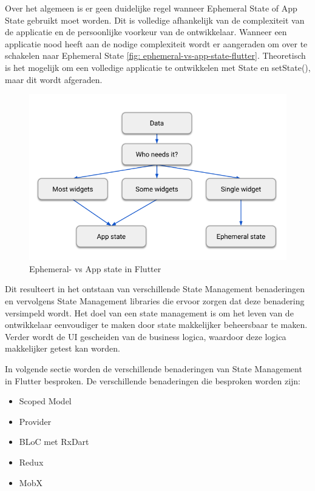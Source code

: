 Over het algemeen is er geen duidelijke regel wanneer Ephemeral State of App State gebruikt moet worden. Dit is volledige afhankelijk van de complexiteit van de applicatie en de persoonlijke voorkeur van de ontwikkelaar.
Wanneer een applicatie nood heeft aan de nodige complexiteit wordt er aangeraden om over te schakelen naar Ephemeral State \ref{fig: ephemeral-vs-app-state-flutter}. Theoretisch is het mogelijk om een volledige applicatie te ontwikkelen met State en setState(), maar dit wordt afgeraden.
\begin{figure}[H]
    \includegraphics[width=\linewidth]{img/stand-van-zaken/ephemeral-vs-app-state-flutter.png}
    \caption{Ephemeral- vs App state in Flutter}
    \label{fig:ephemeral-vs-app-state-flutter}
\end{figure}

Dit resulteert in het ontstaan van verschillende State Management benaderingen en vervolgens State Management libraries die ervoor zorgen dat deze benadering versimpeld wordt.
Het doel van een state management is om het leven van de ontwikkelaar eenvoudiger te
maken door state makkelijker beheersbaar te maken. Verder wordt de UI gescheiden van
de business logica, waardoor deze logica makkelijker getest kan worden. \textcite{Coninck2019}

In volgende sectie worden de verschillende benaderingen van State Management in Flutter besproken.
De verschillende benaderingen die besproken worden zijn: 
\begin{itemize}
    \item Scoped Model
    \item Provider
    \item BLoC met RxDart
    \item Redux
    \item MobX
\end{itemize}

